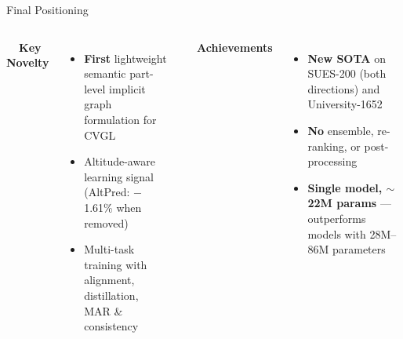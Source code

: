 \documentclass[aspectratio=169, 11pt]{beamer}
\begin{document}
\begin{frame}{Final Positioning}
\begin{columns}[T]
\vspace{0.2cm}
{\large \textbf{\faStar\ \ Key Novelty}}
\vspace{0.2cm}
\begin{itemize}
  \setlength\itemsep{0.6em}
  \item \textbf{First} lightweight semantic part-level implicit graph formulation for CVGL
  \item Altitude-aware learning signal (AltPred: $-$1.61\% when removed)
  \item Multi-task training with alignment, distillation, MAR \& consistency
\end{itemize}

\vspace{0.2cm}
{\large \textbf{\faTrophy\ \ Achievements}}
\vspace{0.2cm}
\begin{itemize}
  \setlength\itemsep{0.6em}
  \item \textbf{New SOTA} on SUES-200 (both directions) and University-1652
  \item \textbf{No} ensemble, re-ranking, or post-processing
  \item \textbf{Single model, $\sim$22M params} --- outperforms models with 28M--86M parameters
\end{itemize}
\end{columns}

\vspace{0.4cm}
\centering
{}
\end{frame}
\end{document}
